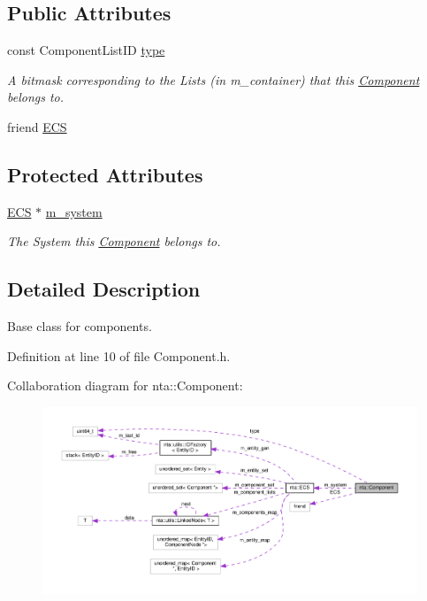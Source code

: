 \subsection*{Public Attributes}
\begin{DoxyCompactItemize}
\item 
\mbox{\label{classnta_1_1Component_a6c27f772281fd6ae13892386a75e7b4e}} 
const Component\+List\+ID \hyperlink{classnta_1_1Component_a6c27f772281fd6ae13892386a75e7b4e}{type}
\begin{DoxyCompactList}\small\item\em A bitmask corresponding to the Lists (in m\+\_\+container) that this \hyperlink{classnta_1_1Component}{Component} belongs to. \end{DoxyCompactList}\item 
friend \hyperlink{classnta_1_1Component_abed0426a01836855941e0236441eaf76}{E\+CS}
\end{DoxyCompactItemize}
\subsection*{Protected Attributes}
\begin{DoxyCompactItemize}
\item 
\mbox{\label{classnta_1_1Component_a382b6ded0bc1bfa123ac31a666d21b20}} 
\hyperlink{classnta_1_1ECS}{E\+CS} $\ast$ \hyperlink{classnta_1_1Component_a382b6ded0bc1bfa123ac31a666d21b20}{m\+\_\+system}
\begin{DoxyCompactList}\small\item\em The System this \hyperlink{classnta_1_1Component}{Component} belongs to. \end{DoxyCompactList}\end{DoxyCompactItemize}


\subsection{Detailed Description}
Base class for components. 

Definition at line 10 of file Component.\+h.



Collaboration diagram for nta\+:\+:Component\+:\nopagebreak
\begin{figure}[H]
\begin{center}
\leavevmode
\includegraphics[width=350pt]{d2/de4/classnta_1_1Component__coll__graph}
\end{center}
\end{figure}


